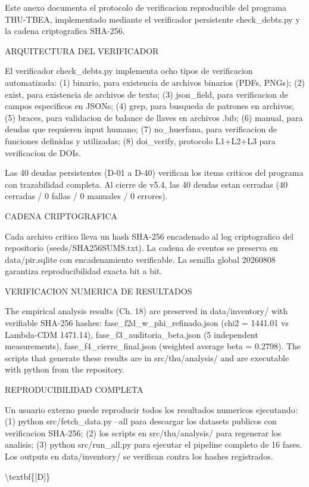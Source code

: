 ﻿\documentclass[11pt,letterpaper]{article}
\begin{document}
Este anexo documenta el protocolo de verificacion reproducible del programa THU-TBEA, implementado mediante el verificador persistente check\_debts.py y la cadena criptografica SHA-256.

ARQUITECTURA DEL VERIFICADOR

El verificador check\_debts.py implementa ocho tipos de verificacion automatizada: (1) binario, para existencia de archivos binarios (PDFs, PNGs); (2) exist, para existencia de archivos de texto; (3) json\_field, para verificacion de campos especificos en JSONs; (4) grep, para busqueda de patrones en archivos; (5) braces, para validacion de balance de llaves en archivos .bib; (6) manual, para deudas que requieren input humano; (7) no\_huerfana, para verificacion de funciones definidas y utilizadas; (8) doi\_verify, protocolo L1+L2+L3 para verificacion de DOIs.

Las 40 deudas persistentes (D-01 a D-40) verifican los items criticos del programa con trazabilidad completa. Al cierre de v5.4, las 40 deudas estan cerradas (40 cerradas / 0 fallas / 0 manuales / 0 errores).

CADENA CRIPTOGRAFICA

Cada archivo critico lleva un hash SHA-256 encadenado al log criptografico del repositorio (seeds/SHA256SUMS.txt). La cadena de eventos se preserva en data/pir.sqlite con encadenamiento verificable. La semilla global 20260808 garantiza reproducibilidad exacta bit a bit.

VERIFICACION NUMERICA DE RESULTADOS

The empirical analysis results (Ch. 18) are preserved in data/inventory/ with verifiable SHA-256 hashes: fase_f2d_w_phi_refinado.json (chi2 = 1441.01 vs Lambda-CDM 1471.14), fase_f3_auditoria_beta.json (5 independent measurements), fase_f4_cierre_final.json (weighted average beta = 0.2798). The scripts that generate these results are in src/thu/analysis/ and are executable with python from the repository.

REPRODUCIBILIDAD COMPLETA

Un usuario externo puede reproducir todos los resultados numericos ejecutando: (1) python src/fetch\_data.py --all para descargar los datasets publicos con verificacion SHA-256; (2) los scripts en src/thu/analysis/ para regenerar los analisis; (3) python src/run\_all.py para ejecutar el pipeline completo de 16 fases. Los outputs en data/inventory/ se verifican contra los hashes registrados.

\textbackslash{}textbf\{[D]\}
\end{document}
